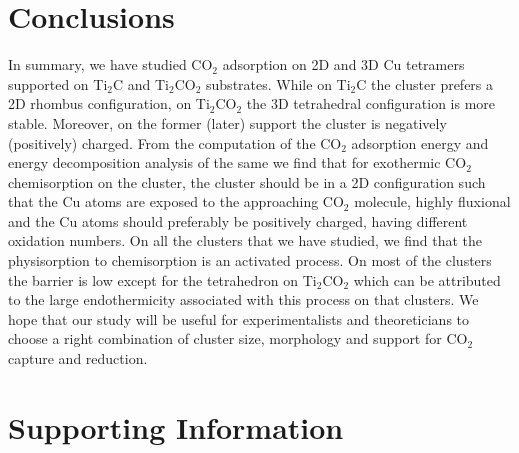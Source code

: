 \section{Conclusions}
\label{concll}
In summary, we have studied CO$_2$ adsorption on 2D and 3D Cu tetramers supported on Ti$_2$C
and Ti$_2$CO$_2$ substrates. While on Ti$_2$C the cluster prefers a 2D rhombus configuration,
on Ti$_2$CO$_2$ the 3D tetrahedral configuration is more stable. Moreover, on the former (later) support
the cluster is negatively (positively) charged. From the computation of the CO$_2$ adsorption
energy and energy decomposition analysis of the same we find that for exothermic CO$_2$ chemisorption on the
cluster, the cluster should be in a 2D configuration such that the Cu atoms are exposed to the
approaching CO$_2$ molecule, highly fluxional and the Cu atoms should preferably be positively charged, having different oxidation numbers. On all the clusters that we have studied, we find that the physisorption
to chemisorption is an activated process. On most of the clusters the barrier is low except for
the tetrahedron on Ti$_2$CO$_2$ which can be attributed to the large endothermicity associated
with this process on that clusters. We hope that our study will be useful for experimentalists
and theoreticians to choose a right combination of cluster size, morphology and support for
CO$_2$ capture and reduction.


\section{Supporting Information}

